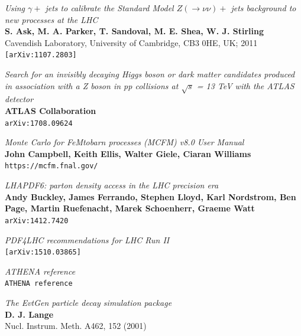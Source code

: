 \documentclass[11pt,a4paper,final]{report}
\begin{document}
\begin{thebibliography}{9}
	\textit{Using $\gamma +$ jets to calibrate the Standard Model $Z(\rightarrow \nu\nu)+$ jets background to new processes at the LHC}\\
	\textbf{S. Ask, M. A. Parker, T. Sandoval, M. E. Shea, W. J. Stirling}\\
Cavendish Laboratory, University of Cambridge, CB3 0HE, UK; 2011\\
	\texttt{[arXiv:1107.2803]}
	
	\textit{Search for an invisibly decaying Higgs boson or dark matter candidates produced in association with a Z boson in pp collisions at $\sqrt{s}$ = 13 TeV with the ATLAS detector}\\
	\textbf{ATLAS Collaboration}\\
	\texttt{arXiv:1708.09624}

	\textit{Monte Carlo for FeMtobarn processes (MCFM) v8.0 User Manual}\\
	\textbf{John Campbell, Keith Ellis, Walter Giele, Ciaran Williams}\\
	\texttt{https://mcfm.fnal.gov/}
	
	\textit{LHAPDF6: parton density access in the LHC precision era}\\
	\textbf{Andy Buckley, James Ferrando, Stephen Lloyd, Karl Nordstrom, Ben Page, Martin Ruefenacht, Marek Schoenherr, Graeme Watt}\\
	\texttt{arXiv:1412.7420}
	
	\textit{PDF4LHC recommendations for LHC Run II}\\
	\texttt{[arXiv:1510.03865]}

	\textit{ATHENA reference}\\
	\texttt{ATHENA reference}
	
	\textit{The EvtGen particle decay simulation package}\\
	\textbf{D. J. Lange}\\
	Nucl. Instrum. Meth. A462, 152 (2001)
	

\end{thebibliography}
\end{document}
